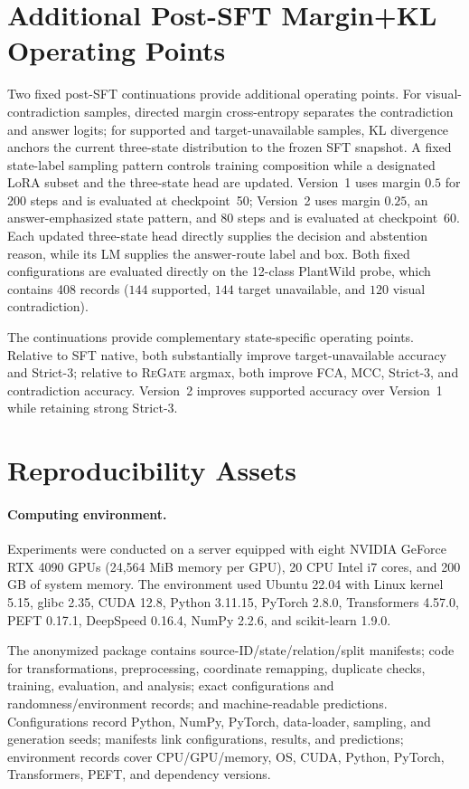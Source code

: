 \documentclass[letterpaper]{article}
\newcommand{\Method}{\textsc{ReGate}\xspace}
\begin{document}
\section{Additional Post-SFT Margin+KL Operating Points}
\label{sec:margin_kl_diagnostic}

Two fixed post-SFT continuations provide additional operating points. For visual-contradiction samples, directed margin cross-entropy separates the contradiction and answer logits; for supported and target-unavailable samples, KL divergence anchors the current three-state distribution to the frozen SFT snapshot. A fixed state-label sampling pattern controls training composition while a designated LoRA subset and the three-state head are updated. Version~1 uses margin $0.5$ for 200 steps and is evaluated at checkpoint~50; Version~2 uses margin $0.25$, an answer-emphasized state pattern, and 80 steps and is evaluated at checkpoint~60. Each updated three-state head directly supplies the decision and abstention reason, while its LM supplies the answer-route label and box. Both fixed configurations are evaluated directly on the 12-class PlantWild probe, which contains 408 records ($144$ supported, $144$ target unavailable, and $120$ visual contradiction).

The continuations provide complementary state-specific operating points. Relative to SFT native, both substantially improve target-unavailable accuracy and Strict-3; relative to \Method argmax, both improve FCA, MCC, Strict-3, and contradiction accuracy. Version~2 improves supported accuracy over Version~1 while retaining strong Strict-3.

\section{Reproducibility Assets}
\label{sec:reproducibility_assets}

\paragraph{Computing environment.}
Experiments were conducted on a server equipped with eight
NVIDIA GeForce RTX 4090 GPUs (24,564 MiB memory per GPU),
20 CPU Intel i7 cores, and 200 GB of system memory. The environment used Ubuntu 22.04 with 
Linux kernel 5.15, glibc 2.35, CUDA 12.8, Python 3.11.15, PyTorch 2.8.0, Transformers 4.57.0, PEFT 0.17.1, DeepSpeed 0.16.4, NumPy 2.2.6, and scikit-learn 1.9.0.

The anonymized package contains source-ID/state/relation/split manifests; code
for transformations, preprocessing, coordinate remapping, duplicate checks,
training, evaluation, and analysis; exact configurations and
randomness/environment records; and machine-readable predictions.
Configurations record Python, NumPy, PyTorch, data-loader, sampling, and
generation seeds; manifests link configurations, results, and predictions;
environment records cover CPU/GPU/memory, OS, CUDA, Python, PyTorch,
Transformers, PEFT, and dependency versions.
\end{document}
